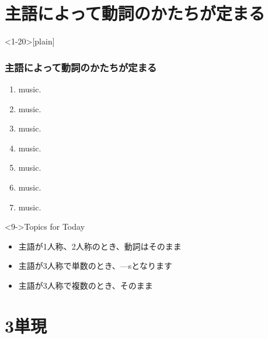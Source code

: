 \documentclass[aspectratio=169,xcolor={dvipsnames,table}]{beamer}
\begin{document}
\section{主語によって動詞のかたちが定まる}
\begin{frame}<1-20>[plain]\frametitle{主語によって動詞のかたちが定まる}
  \begin{enumerate}
   \item<1->   music. \hfill{}
   \item<1->   music.
   \item<1->   music.
   \item<1->   music.
   \item<1->   music.
   \item<1->   music.
   \item<1->   music.
  \end{enumerate}
\begin{block}<9->{Topics for Today}\small
\begin{itemize}[square]
 \item {主語が1人称、2人称のとき、動詞はそのまま}
 \item {主語が3人称で単数のとき、---sとなります}
 \item {主語が3人称で複数のとき、そのまま}
\end{itemize}
      \end{block}
\end{frame}
\section{3単現}
\end{document}
